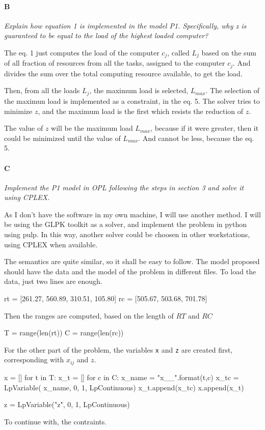 \documentclass[11pt,a4paper,twocolumn]{article}
\begin{document}
\paragraph*{B}
\textsl{Explain how equation 1 is implemented in the model P1. Specifically, why 
z is guaranteed to be equal to the load of the highest loaded computer?}

The eq. 1 just computes the load of the computer $c_j$, called $L_j$ based on 
the sum of all fraction of resources from all the tasks, assigned to the 
computer $c_j$. And divides the sum over the total computing resource available, 
to get the load.

Then, from all the loads $L_j$, the maximum load is selected, $L_{max}$. The 
selection of the maximun load is implemented as a constraint, in the eq. 5. The 
solver tries to minimize $z$, and the maximum load is the first which resists 
the reduction of $z$.

The value of $z$ will be the maximum load $L_{max}$, because if it were greater, 
then it could be minimized until the value of $L_{max}$. And cannot be less, 
because the eq. 5.

\paragraph*{C}
\textsl{Implement the P1 model in OPL following the steps in section 3 and solve 
it using CPLEX.}

As I don't have the software in my own machine, I will use another method. I 
will be using the GLPK toolkit as a solver, and implement the problem in python 
using pulp. In this way, another solver could be choosen in other workstations, 
using CPLEX when available.

The semantics are quite similar, so it shall be easy to follow. The model 
proposed should have the data and the model of the problem in different files.  
To load the data, just two lines are enough.
%
\begin{pycode}
rt = [261.27, 560.89, 310.51, 105.80]
rc = [505.67, 503.68, 701.78]
\end{pycode}
%
Then the ranges are computed, based on the length of $RT$ and $RC$
%
\begin{pycode}
T = range(len(rt))
C = range(len(rc))
\end{pycode}
%
For the other part of the problem, the variables \texttt{x} and \texttt{z} are 
created first, corresponding with $x_{ij}$ and $z$.
%
\begin{pycode}
x = []
for t in T:
	x_t = []
	for c in C:
		x_name = "x_{}_{}".format(t,c)
		x_tc = LpVariable(
			x_name,
			0,
			1,
			LpContinuous)
		x_t.append(x_tc)
	x.append(x_t)

z = LpVariable("z", 0, 1, LpContinuous)
\end{pycode}
%
To continue with, the contraints.
\end{document}
